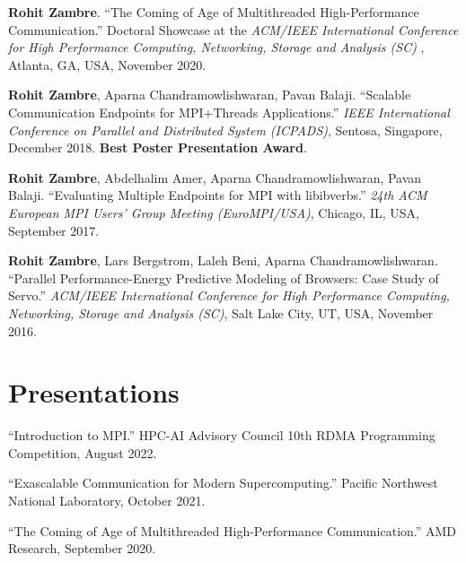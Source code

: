 \documentclass[11pt,article,oneside]{memoir}
\begin{document}
\begin{etaremune}

\item \textbf{Rohit Zambre}. ``The Coming of Age of Multithreaded High-Performance Communication.'' Doctoral Showcase at the \emph{ACM/IEEE International Conference for High Performance Computing, Networking, Storage and Analysis (SC) }, Atlanta, GA, USA, November 2020.

\item \textbf{Rohit Zambre}, Aparna Chandramowlishwaran, Pavan Balaji. ``Scalable Communication Endpoints for MPI+Threads Applications.'' \emph{IEEE International Conference on Parallel and Distributed System (ICPADS)}, Sentosa, Singapore, December 2018. \textbf{\textcolor{nice-purple}{Best Poster Presentation Award}}.

\item \textbf{Rohit Zambre}, Abdelhalim Amer, Aparna Chandramowlishwaran, Pavan Balaji. ``Evaluating Multiple Endpoints for MPI with libibverbs.'' \emph{24th ACM European MPI Users' Group Meeting (EuroMPI/USA)}, Chicago, IL, USA, September 2017.

\item \textbf{Rohit Zambre}, Lars Bergstrom, Laleh Beni, Aparna Chandramowlishwaran. ``Parallel Performance-Energy Predictive Modeling of Browsers: Case Study of Servo.'' \emph{ACM/IEEE International Conference for High Performance Computing, Networking, Storage and Analysis (SC)}, Salt Lake City, UT, USA, November 2016.

\end{etaremune}

\section{Presentations}

\medskip

\ind ``Introduction to MPI.'' HPC-AI Advisory Council 10th RDMA Programming Competition, August 2022.
\vspace{0.01in}

\medskip

\ind ``Exascalable Communication for Modern Supercomputing.'' Pacific Northwest National Laboratory, October 2021.
\vspace{0.01in}

\ind ``The Coming of Age of Multithreaded High-Performance Communication.'' AMD Research, September 2020.
\vspace{0.01in}
\end{document}
